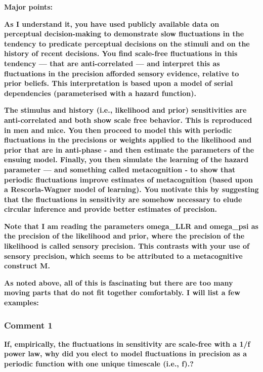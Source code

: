 \documentclass[
]{article}
\begin{document}
\textbf{Major points:}

\textbf{As I understand it, you have used publicly available data on
perceptual decision-making to demonstrate slow fluctuations in the
tendency to predicate perceptual decisions on the stimuli and on the
history of recent decisions. You find scale-free fluctuations in this
tendency --- that are anti-correlated --- and interpret this as
fluctuations in the precision afforded sensory evidence, relative to
prior beliefs. This interpretation is based upon a model of serial
dependencies (parameterised with a hazard function).}

\textbf{The stimulus and history (i.e., likelihood and prior)
sensitivities are anti-correlated and both show scale free behavior.
This is reproduced in men and mice. You then proceed to model this with
periodic fluctuations in the precisions or weights applied to the
likelihood and prior that are in anti-phase - and then estimate the
parameters of the ensuing model. Finally, you then simulate the learning
of the hazard parameter --- and something called metacognition - to show
that periodic fluctuations improve estimates of metacognition (based
upon a Rescorla-Wagner model of learning). You motivate this by
suggesting that the fluctuations in sensitivity are somehow necessary to
elude circular inference and provide better estimates of precision.}

\textbf{Note that I am reading the parameters omega\_LLR and omega\_psi
as the precision of the likelihood and prior, where the precision of the
likelihood is called sensory precision. This contrasts with your use of
sensory precision, which seems to be attributed to a metacognitive
construct M.}

\textbf{As noted above, all of this is fascinating but there are too
many moving parts that do not fit together comfortably. I will list a
few examples:}

\hypertarget{comment-1}{%
\subsubsection{Comment 1}\label{comment-1}}

\textbf{If, empirically, the fluctuations in sensitivity are scale-free
with a 1/f power law, why did you elect to model fluctuations in
precision as a periodic function with one unique timescale (i.e., f).?}
\end{document}
